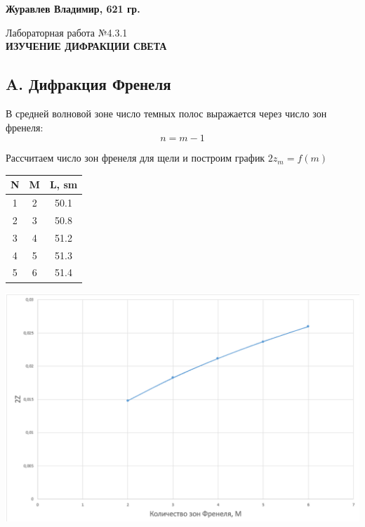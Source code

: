 \documentclass[12pt,a4paper]{article}
\author{Владимир Журавлев}
\begin{document}
\begin{flushright}

\textbf{Журавлев Владимир, 621 гр.\\}


\end{flushright}
\begin{center}
\begin{LARGE}

\vspace{\baselineskip}
Лабораторная работа №4.3.1\\
\textbf{
ИЗУЧЕНИЕ ДИФРАКЦИИ СВЕТА}\\
\vspace{\baselineskip}

\end{LARGE}
\end{center}

\subsection{A. Дифракция Френеля}

В средней волновой зоне число темных полос выражается через число зон френеля:
\[n= m - 1 \]

Рассчитаем число зон френеля для щели и построим график $2z_m = f(m)$

\begin{center}
\begin{tabular}{|c|c|c|}
\hline 
N & M & L, sm \\ 
\hline 
1 & 2 & 50.1 \\ 
\hline 
2 & 3 & 50.8 \\ 
\hline 
3 & 4 & 51.2 \\ 
\hline 
4 & 5 & 51.3 \\ 
\hline 
5 & 6 & 51.4 \\ 
\hline 
\end{tabular} 

\includegraphics[scale=0.6]{451_1.png}
\end{center}
\end{document}

